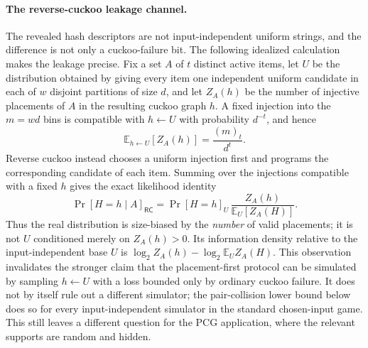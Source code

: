 \paragraph{The reverse-cuckoo leakage channel.}
The revealed hash descriptors are not input-independent uniform strings, and
the difference is not only a cuckoo-failure bit.  The following idealized
calculation makes the leakage precise.  Fix a set $A$ of $t$ distinct active
items, let $U$ be the distribution obtained by giving every item one
independent uniform candidate in each of $w$ disjoint partitions of size $d$,
and let $Z_A(h)$ be the number of injective placements of $A$ in the resulting
cuckoo graph $h$.  A fixed injection into the $m=wd$ bins is compatible with
$h\gets U$ with probability $d^{-t}$, and hence
\[
    \mathbb E_{h\gets U}[Z_A(h)] = \frac{(m)_t}{d^t}.
\]
Reverse cuckoo instead chooses a uniform injection first and programs the
corresponding candidate of each item.  Summing over the injections compatible
with a fixed $h$ gives the exact likelihood identity
\begin{equation}\label{eq:rev-cuckoo-size-bias}
 \Pr[H=h\mid A]_{\mathsf{RC}}
   = \Pr[H=h]_{U}\,
     \frac{Z_A(h)}{\mathbb E_{U}[Z_A(H)]}.
\end{equation}
Thus the real distribution is size-biased by the \emph{number} of valid
placements; it is not $U$ conditioned merely on $Z_A(h)>0$.  Its information
density relative to the input-independent base $U$ is
$\log_2 Z_A(h)-\log_2\mathbb E_U Z_A(H)$.  This observation invalidates the
stronger claim that the placement-first protocol can be simulated by sampling
$h\gets U$ with a loss bounded only by ordinary cuckoo failure.  It does not
by itself rule out a different simulator; the pair-collision lower bound below
does so for every input-independent simulator in the standard chosen-input
game.  This still leaves a different question for the PCG application, where
the relevant supports are random and hidden.

